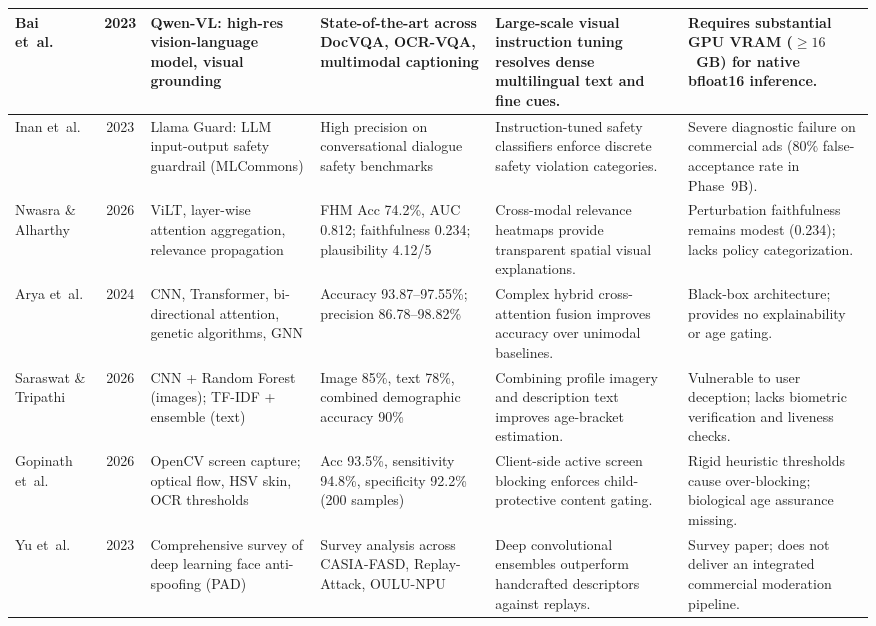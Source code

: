 \documentclass[12pt,a4paper]{report}
\begin{document}
\begin{table}[htbp]
\begin{tabular}{|p{1.4cm}|c|p{3.2cm}|p{3.4cm}|p{4.2cm}|p{3.4cm}|}
Bai et~al.~\cite{bai2023qwen} & 2023 &
Qwen-VL: high-res vision-language model, visual grounding &
State-of-the-art across DocVQA, OCR-VQA, multimodal captioning &
Large-scale visual instruction tuning resolves dense multilingual text and fine cues. &
Requires substantial GPU VRAM ($\ge 16$~GB) for native bfloat16 inference. \\ \hline

Inan et~al.~\cite{inan2023llama} & 2023 &
Llama Guard: LLM input-output safety guardrail (MLCommons) &
High precision on conversational dialogue safety benchmarks &
Instruction-tuned safety classifiers enforce discrete safety violation categories. &
Severe diagnostic failure on commercial ads ($80\%$ false-acceptance rate in Phase~9B). \\ \hline

Nwasra \& Alharthy~\cite{nwasra2026} & 2026 &
ViLT, layer-wise attention aggregation, relevance propagation &
FHM Acc 74.2\%, AUC 0.812; faithfulness 0.234; plausibility 4.12/5 &
Cross-modal relevance heatmaps provide transparent spatial visual explanations. &
Perturbation faithfulness remains modest (0.234); lacks policy categorization. \\ \hline

Arya et~al.~\cite{arya2024} & 2024 &
CNN, Transformer, bi-directional attention, genetic algorithms, GNN &
Accuracy 93.87--97.55\%; precision 86.78--98.82\% &
Complex hybrid cross-attention fusion improves accuracy over unimodal baselines. &
Black-box architecture; provides no explainability or age gating. \\ \hline

Saraswat \& Tripathi~\cite{saraswat2026} & 2026 &
CNN + Random Forest (images); TF-IDF + ensemble (text) &
Image 85\%, text 78\%, combined demographic accuracy 90\% &
Combining profile imagery and description text improves age-bracket estimation. &
Vulnerable to user deception; lacks biometric verification and liveness checks. \\ \hline

Gopinath et~al.~\cite{safevision2026} & 2026 &
OpenCV screen capture; optical flow, HSV skin, OCR thresholds &
Acc 93.5\%, sensitivity 94.8\%, specificity 92.2\% (200 samples) &
Client-side active screen blocking enforces child-protective content gating. &
Rigid heuristic thresholds cause over-blocking; biological age assurance missing. \\ \hline

Yu et~al.~\cite{yu2023} & 2023 &
Comprehensive survey of deep learning face anti-spoofing (PAD) &
Survey analysis across CASIA-FASD, Replay-Attack, OULU-NPU &
Deep convolutional ensembles outperform handcrafted descriptors against replays. &
Survey paper; does not deliver an integrated commercial moderation pipeline. \\ \hline


\end{tabular}
\end{table}
\end{document}
